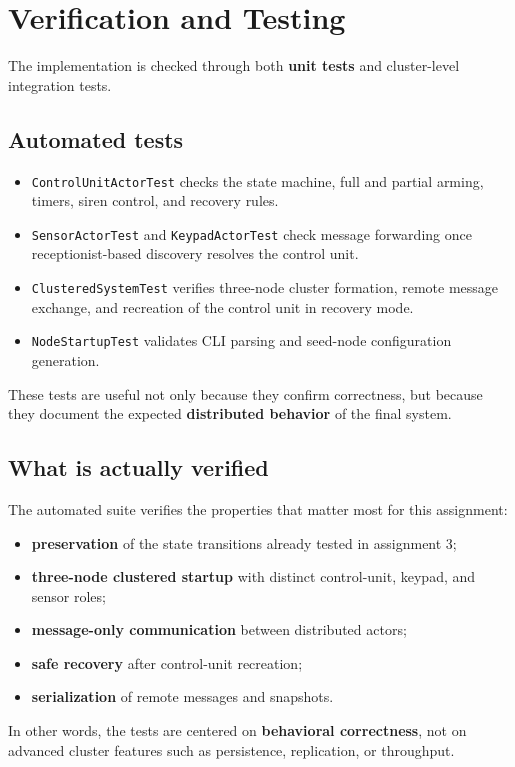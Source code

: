 \clearpage
\section{Verification and Testing}

The implementation is checked through both \textbf{unit tests} and cluster-level
integration tests.

\subsection{Automated tests}

\begin{itemize}
    \item \texttt{ControlUnitActorTest} checks the state machine, full and partial arming, timers, siren control, and recovery rules.
    \item \texttt{SensorActorTest} and \texttt{KeypadActorTest} check message forwarding once receptionist-based discovery resolves the control unit.
    \item \texttt{ClusteredSystemTest} verifies three-node cluster formation, remote message exchange, and recreation of the control unit in recovery mode.
    \item \texttt{NodeStartupTest} validates CLI parsing and seed-node configuration generation.
\end{itemize}

These tests are useful not only because they confirm correctness, but because
they document the expected \textbf{distributed behavior} of the final system.

\subsection{What is actually verified}

The automated suite verifies the properties that matter most for this
assignment:

\begin{itemize}
    \item \textbf{preservation} of the state transitions already tested in assignment 3;
    \item \textbf{three-node clustered startup} with distinct control-unit, keypad, and sensor roles;
    \item \textbf{message-only communication} between distributed actors;
    \item \textbf{safe recovery} after control-unit recreation;
    \item \textbf{serialization} of remote messages and snapshots.
\end{itemize}

In other words, the tests are centered on \textbf{behavioral correctness}, not on
advanced cluster features such as persistence, replication, or throughput.
